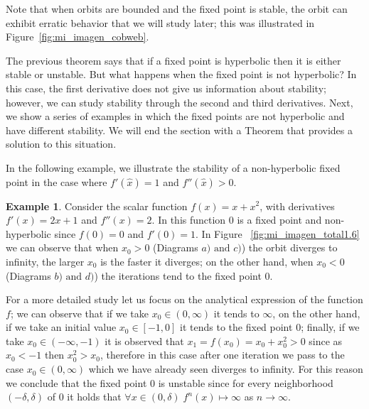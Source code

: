 \documentclass[12pt,a4paper]{report}
\theoremstyle{definition}
\newtheorem{ejemplo}{Example}[section]
\begin{document}
Note that when orbits are bounded and the fixed point is stable, the orbit can exhibit erratic behavior that we will study later; this was illustrated in Figure~\ref{fig:mi_imagen_cobweb}.

The previous theorem says that if a fixed point is hyperbolic then it is either stable or unstable.
But what happens when the fixed point is not hyperbolic? In this case, the first derivative does not give us information about stability; however, we can study stability through the second and third derivatives. Next, we show a series of examples in which the fixed points are not hyperbolic and have different stability. We will end the section with a Theorem that provides a solution to this situation.

In the following example, we illustrate the stability of a non-hyperbolic fixed point in the case where \( f'(\hat{x}) = 1 \) and \( f''(\hat{x}) > 0 \).

\begin{ejemplo}

Consider the scalar function $f(x) = x + x^2 $, with derivatives $f'(x) = 2  x + 1$ and $f''(x) = 2$. In this function $0$ is a fixed point and non-hyperbolic since $f(0) = 0 $ and $f'(0) = 1$. In Figure ~\ref{fig:mi_imagen_total1.6} we can observe that when $x_0 > 0$ (Diagrams $a) \text{  and  } c)$) the orbit diverges to infinity, the larger $x_0$ is the faster it diverges; on the other hand, when $x_0 < 0$ (Diagrams $b) \text{ and } d)$) the iterations tend to the fixed point $0$.

For a more detailed study let us focus on the analytical expression of the function $f$; we can observe that if we take $x_0 \in (0, \infty)$ it tends to $\infty$, on the other hand, if we take an initial value $x_0 \in [-1,0]$ it tends to the fixed point $0$; finally, if we take $x_0 \in (-\infty, -1)$ it is observed that $x_1 
 = f(x_0) = x_0 + x_0^2 > 0$ since as $x_0 < -1$ then $x_0^2 > x_0$, therefore in this case after one iteration we pass to the case $x_0 \in (0,\infty)$ which we have already seen diverges to infinity. For this reason we conclude that the fixed point $0$ is unstable since for every neighborhood $(-\delta,\delta)$ of $0$ it holds that $\forall x \in (0, \delta) \; f^n(x) \mapsto \infty$ as $n \to \infty$. 
    
\end{ejemplo}
\end{document}
